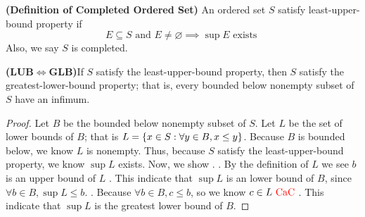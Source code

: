 \documentclass{report}
\begin{document}
\begin{definition}
  \textbf{(Definition of Completed Ordered Set)}
An ordered set $S$ satisfy least-upper-bound property if
 \begin{equation}
E\subseteq S\text{ and }E\neq \varnothing\implies \sup E\text{ exists }
\end{equation}
Also, we say $S$ is completed.
\end{definition}
\begin{theorem}
  \textbf{(LUB$\iff $GLB)}If $S$ satisfy the least-upper-bound property, then $S$ satisfy the greatest-lower-bound property; that is, every bounded below nonempty subset of $S$ have an infimum.
\end{theorem}
\begin{proof}
Let $B$ be the bounded below nonempty subset of $S$. Let $L$ be the set of lower bounds of $B $; that is $L=\{ x\in S: \forall y\in B, x\leq y \}$. Because $B$ is bounded below, we know $L$ is nonempty. Thus, because $S$ satisfy the least-upper-bound property, we know $\sup L$ exists. Now, we show . . By the definition of $L$ we see $b$ is an upper bound of $L$ \CaC. This indicate that $\sup L$ is an lower bound of $B$, since $\forall b\in B, \sup L\leq b$. . Because $\forall b\in B, c\leq b$, so we know $c\in L\text{ \textcolor{red}{CaC} }$. This indicate that $\sup L$ is the greatest lower bound of $B$.  
\end{proof}
\end{document}
